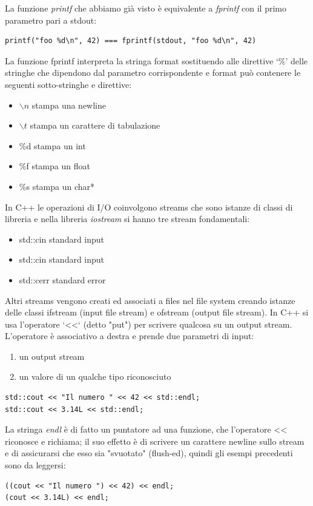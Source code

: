 \documentclass[a4paper,12pt, oneside]{book}
\begin{document}
La funzione \textit{printf} che abbiamo già visto è equivalente a
\textit{fprintf} con il primo parametro pari a stdout:
\begin{verbatim}
printf("foo %d\n", 42) === fprintf(stdout, "foo %d\n", 42)
\end{verbatim}
La funzione fprintf interpreta la stringa format sostituendo
alle direttive ‘\%' delle stringhe che dipendono dal parametro
corrispondente e format può contenere le seguenti sotto-stringhe e direttive:
\begin{itemize}
\item $\backslash n$ stampa una newline
\item $\backslash t$ stampa un carattere di tabulazione
\item \%d stampa un int
\item \%f stampa un float
\item \%s stampa un char*

\end{itemize}
In C++ le operazioni di I/O coinvolgono streams che sono
istanze di classi di libreria e nella libreria \textit{iostream} si hanno tre stream fondamentali:
\begin{itemize}
\item std::cin standard input
\item std::cin standard input
\item std::cerr standard error
\end{itemize}
Altri streams vengono creati ed associati a files nel file system
creando istanze delle classi ifstream (input file stream) e
ofstream (output file stream). In C++ si usa l'operatore ‘<<‘ (detto "put") per scrivere qualcosa
su un output stream. L'operatore è associativo a destra e prende due parametri di
input:
\begin{enumerate}
\item un output stream
\item un valore di un qualche tipo riconosciuto
\end{enumerate}
\begin{verbatim}
std::cout << "Il numero " << 42 << std::endl;
std::cout << 3.14L << std::endl;
\end{verbatim}
La stringa \textit{endl }è di fatto un puntatore ad una funzione, che
l'operatore << riconosce e richiama; il suo effetto è di scrivere
un carattere newline sullo stream e di assicurarsi che esso sia
"svuotato" (flush-ed), quindi gli esempi precedenti sono da leggersi:
\begin{verbatim}
((cout << "Il numero ") << 42) << endl;
(cout << 3.14L) << endl;
\end{verbatim}
\end{document}
